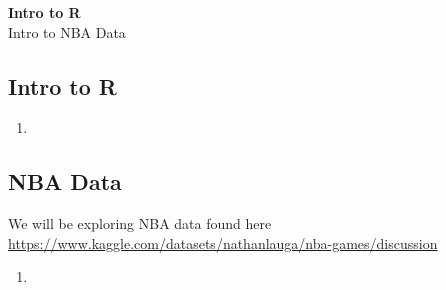 
\usepackage{hyperref}



\begin{center}
{\large \bf Intro to R }   \\ \large Intro to NBA Data \\ 
\end{center}

\subsection*{Intro to R}

\begin{enumerate}

\item 
\end{enumerate} 


\subsection*{NBA Data}


We will be exploring NBA data found here \url{https://www.kaggle.com/datasets/nathanlauga/nba-games/discussion}

\begin{enumerate}

\item 
\end{enumerate} 




